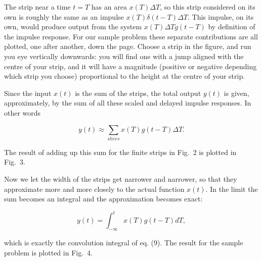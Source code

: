   The strip near a time $t=T$ has an area $x(T) \Delta T$, so this strip 
  considered on its own is roughly the same as an impulse $x(T) \delta(t-T) 
  \Delta T$. This impulse, on its own, would produce output from the system 
  $x(T) \Delta T g(t-T)$ by definition of the impulse response. For our sample 
  problem these separate contributions are all plotted, one after another, down 
  the page. Choose a strip in the figure, and run you eye vertically downwards: 
  you will find one with a jump aligned with the centre of your strip, and it 
  will have a magnitude (positive or negative depending which strip you choose) 
  proportional to the height at the centre of your strip. 


  Since the input $x(t)$ is the sum of the strips, the total output $y(t)$ is 
  given, approximately, by the sum of all these scaled and delayed impulse 
  responses. In other words 

  $$y(t) \approx \sum_{slices}{x(T) g(t-T) \Delta T} . \tag{11}$$ 

  The result of adding up this sum for the finite strips in Fig.\ 2 is plotted 
  in Fig.\ 3. 


  Now we let the width of the strips get narrower and narrower, so that they 
  approximate more and more closely to the actual function $x(t)$. In the limit 
  the sum becomes an integral and the approximation becomes exact: 

  $$y(t)=\int_{-\infty}^{t}{x(T) g(t-T) dT} , \tag{12}$$ 

  which is exactly the convolution integral of eq. (9). The result for the 
  sample problem is plotted in Fig.\ 4. 

